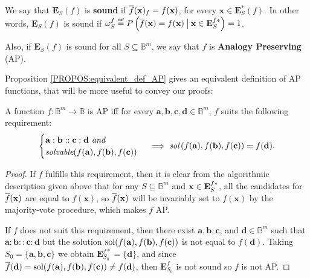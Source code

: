 \begin{definition}
  We say that $\mathbf{E}_S(f)$ is {\bf sound} if
  $\overline{f}(\mathbf{x})_f=f(\mathbf{x})$, for every $\mathbf{x} \in
  \mathbf{E}^*_S(f)$. In other words, $\mathbf{E}_S(f)$ is sound if $\omegasf
  \eqdef P\left(\albl{\mathbf{x}} = f(\mathbf{x}) \given[\big] \mathbf{x} \in
  \esfs\right) = 1$.

  \noindent
  Also, if $\mathbf{E}_S(f)$ is sound for all $S \subseteq
  \mathbb{B}^m$, we say that $f$ is {\bf Analogy Preserving} (AP).
\end{definition}

\noindent
Proposition \ref{PROPOS:equivalent_def_AP} gives an equivalent definition of AP
functions, that will be more useful to convey our proofs:

\begin{proposition}
  \label{PROPOS:equivalent_def_AP}
  A function $f \colon \mathbb{B}^m \to \mathbb{B}$ is AP iff for every
  $\mathbf{a}, \mathbf{b}, \mathbf{c}, \mathbf{d} \in \mathbb{B}^m$, $f$ suits
  the following requirement:
  $$
  \begin{cases}
    \mathbf{a} :  \mathbf{b} ::  \mathbf{c} :  \mathbf{d} \emph{ and }\\
    \emph{solvable}(f(\mathbf{a}), f(\mathbf{b}),  f(\mathbf{c}))
  \end{cases}
  \implies \emph{sol}\left(f(\mathbf{a}),  f(\mathbf{b}),  f(\mathbf{c})\right) =
  f(\mathbf{d}). $$
\end{proposition}
\begin{proof}
  If $f$ fulfills  this requirement, then it is clear from the algorithmic
  description given above that for any $S \subseteq \mathbb{B}^m$ and
  $\mathbf{x} \in \mathbf{E}_{S}^{f*}$, all the candidates for $\overline{f}(\mathbf{x})$ are equal
  to $f(\mathbf{x})$, so $\overline{f}(\mathbf{x})$ will be invariably set to
  $f(\mathbf{x})$ by the majority-vote procedure, which makes $f$ AP.

If $f$ does not suit this requirement, then there exist $\mathbf{a},
  \mathbf{b}, \mathbf{c}$, and $\mathbf{d} \in \mathbb{B}^m$ such that
  $\mathbf{a} : \mathbf{b} :: \mathbf{c} : \mathbf{d}$ but the solution
  $\text{sol}(f(\mathbf{a}), f(\mathbf{b}), f(\mathbf{c}))$ is not equal to
  $f(\mathbf{d})$. Taking $S_0 = \{\mathbf{a}, \mathbf{b}, \mathbf{c}\}$ we
  obtain $\mathbf{E}^{f*}_{S_0} = \{\mathbf{d}\}$, and since $\overline{f}(\mathbf{d})
  = \text{sol}(f(\mathbf{a}), f(\mathbf{b}), f(\mathbf{c})) \neq f(\mathbf{d})$, then
  $\mathbf{E}_{S_0}^f$ is not sound so $f$ is not AP.
\end{proof}

